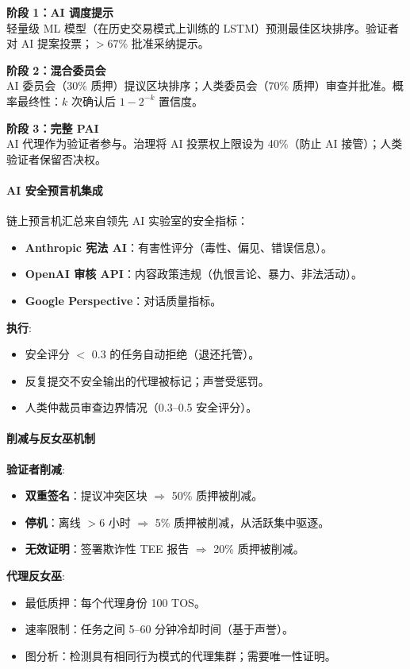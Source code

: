 \documentclass[11pt]{article}
\begin{document}
\textbf{阶段 1：AI 调度提示}\\
轻量级 ML 模型（在历史交易模式上训练的 LSTM）预测最佳区块排序。验证者对 AI 提案投票；$>$67\% 批准采纳提示。

\textbf{阶段 2：混合委员会}\\
AI 委员会（30\% 质押）提议区块排序；人类委员会（70\% 质押）审查并批准。概率最终性：$k$ 次确认后 $1 - 2^{-k}$ 置信度。

\textbf{阶段 3：完整 PAI}\\
AI 代理作为验证者参与。治理将 AI 投票权上限设为 40\%（防止 AI 接管）；人类验证者保留否决权。

\paragraph{AI 安全预言机集成}
链上预言机汇总来自领先 AI 实验室的安全指标：
\begin{itemize}[noitemsep]
  \item \textbf{Anthropic 宪法 AI}：有害性评分（毒性、偏见、错误信息）。
  \item \textbf{OpenAI 审核 API}：内容政策违规（仇恨言论、暴力、非法活动）。
  \item \textbf{Google Perspective}：对话质量指标。
\end{itemize}

\textbf{执行}:
\begin{itemize}[noitemsep]
  \item 安全评分 $<$ 0.3 的任务自动拒绝（退还托管）。
  \item 反复提交不安全输出的代理被标记；声誉受惩罚。
  \item 人类仲裁员审查边界情况（0.3--0.5 安全评分）。
\end{itemize}

\paragraph{削减与反女巫机制}
\textbf{验证者削减}:
\begin{itemize}[noitemsep]
  \item \textbf{双重签名}：提议冲突区块 $\Rightarrow$ 50\% 质押被削减。
  \item \textbf{停机}：离线 $>$6 小时 $\Rightarrow$ 5\% 质押被削减，从活跃集中驱逐。
  \item \textbf{无效证明}：签署欺诈性 TEE 报告 $\Rightarrow$ 20\% 质押被削减。
\end{itemize}

\textbf{代理反女巫}:
\begin{itemize}[noitemsep]
  \item 最低质押：每个代理身份 100 TOS。
  \item 速率限制：任务之间 5--60 分钟冷却时间（基于声誉）。
  \item 图分析：检测具有相同行为模式的代理集群；需要唯一性证明。
\end{itemize}
\end{document}

